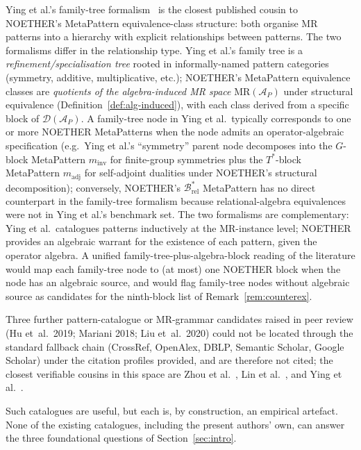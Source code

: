 \documentclass[manuscript]{acmart}
\begin{document}
Ying et al.'s family-tree formalism~\cite{Ying2025MRPatterns} is the closest published cousin to NOETHER's MetaPattern equivalence-class structure: both organise MR patterns into a hierarchy with explicit relationships between patterns. The two formalisms differ in the relationship type. Ying et al.'s family tree is a \emph{refinement/specialisation tree} rooted in informally-named pattern categories (symmetry, additive, multiplicative, etc.); NOETHER's MetaPattern equivalence classes are \emph{quotients of the algebra-induced MR space} $\mathrm{MR}(\mathcal{A}_P)$ under structural equivalence (Definition~\ref{def:alg-induced}), with each class derived from a specific block of $\mathcal{D}(\mathcal{A}_P)$. A family-tree node in Ying et al.\ typically corresponds to one or more NOETHER MetaPatterns when the node admits an operator-algebraic specification (e.g.\ Ying et al.'s ``symmetry'' parent node decomposes into the $G$-block MetaPattern $m_{\mathrm{inv}}$ for finite-group symmetries plus the $T^{*}$-block MetaPattern $m_{\mathrm{adj}}$ for self-adjoint dualities under NOETHER's structural decomposition); conversely, NOETHER's $\mathcal{B}^{*}_{\mathrm{rel}}$ MetaPattern has no direct counterpart in the family-tree formalism because relational-algebra equivalences were not in Ying et al.'s benchmark set. The two formalisms are complementary: Ying et al.\ catalogues patterns inductively at the MR-instance level; NOETHER provides an algebraic warrant for the existence of each pattern, given the operator algebra. A unified family-tree-plus-algebra-block reading of the literature would map each family-tree node to (at most) one NOETHER block when the node has an algebraic source, and would flag family-tree nodes without algebraic source as candidates for the ninth-block list of Remark~\ref{rem:counterex}.

Three further pattern-catalogue or MR-grammar candidates raised in peer review (Hu et~al.\ 2019; Mariani 2018; Liu et~al.\ 2020) could not be located through the standard fallback chain (CrossRef, OpenAlex, DBLP, Semantic Scholar, Google Scholar) under the citation profiles provided, and are therefore not cited; the closest verifiable cousins in this space are Zhou et al.~\cite{Zhou2020SymmetryMRP}, Lin et al.~\cite{Lin2018HierarchicalMR}, and Ying et al.~\cite{Ying2025MRPatterns}.

Such catalogues are useful, but each is, by construction, an empirical artefact. None of the existing catalogues, including the present authors' own, can answer the three foundational questions of Section~\ref{sec:intro}.
\end{document}
